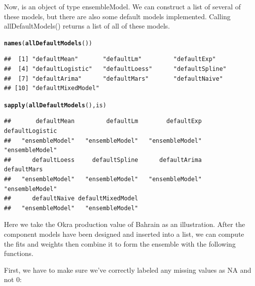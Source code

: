 \documentclass[nojss]{jss}\usepackage[]{graphicx}\usepackage[]{color}
\makeatletter
\newcommand{\hlstd}[1]{\textcolor[rgb]{0.345,0.345,0.345}{#1}}%
\newcommand{\hlkwd}[1]{\textcolor[rgb]{0.737,0.353,0.396}{\textbf{#1}}}%
\newenvironment{kframe}{%
 \def\at@end@of@kframe{}%
 \ifinner\ifhmode%
  \def\at@end@of@kframe{\end{minipage}}%
  \begin{minipage}{\columnwidth}%
 \fi\fi%
 \def\FrameCommand##1{\hskip\@totalleftmargin \hskip-\fboxsep
 \colorbox{shadecolor}{##1}\hskip-\fboxsep
     \hskip-\linewidth \hskip-\@totalleftmargin \hskip\columnwidth}%
 \MakeFramed {\advance\hsize-\width
   \@totalleftmargin\z@ \linewidth\hsize
   \@setminipage}}%
 {\par\unskip\endMakeFramed%
 \at@end@of@kframe}
\newenvironment{knitrout}{}{} %
\makeatother
\begin{document}
Now,  is an object of type ensembleModel.  We can construct a list of
several of these models, but there are also some default models implemented.
Calling allDefaultModels() returns a list of all of these models.

\begin{knitrout}
\color{fgcolor}\begin{kframe}
\begin{alltt}
\hlkwd{names}\hlstd{(}\hlkwd{allDefaultModels}\hlstd{())}
\end{alltt}
\begin{verbatim}
##  [1] "defaultMean"       "defaultLm"         "defaultExp"       
##  [4] "defaultLogistic"   "defaultLoess"      "defaultSpline"    
##  [7] "defaultArima"      "defaultMars"       "defaultNaive"     
## [10] "defaultMixedModel"
\end{verbatim}
\begin{alltt}
\hlkwd{sapply}\hlstd{(}\hlkwd{allDefaultModels}\hlstd{(), is)}
\end{alltt}
\begin{verbatim}
##       defaultMean         defaultLm        defaultExp   defaultLogistic 
##   "ensembleModel"   "ensembleModel"   "ensembleModel"   "ensembleModel" 
##      defaultLoess     defaultSpline      defaultArima       defaultMars 
##   "ensembleModel"   "ensembleModel"   "ensembleModel"   "ensembleModel" 
##      defaultNaive defaultMixedModel 
##   "ensembleModel"   "ensembleModel"
\end{verbatim}
\end{kframe}
\end{knitrout}

Here we take the Okra production value of Bahrain as an
illustration. After the component models have been designed and
inserted into a list, we can compute the fits and weights then
combine it to form the ensemble with the following functions.

First, we have to make sure we've correctly labeled any missing values as NA
and not 0:
\end{document}
